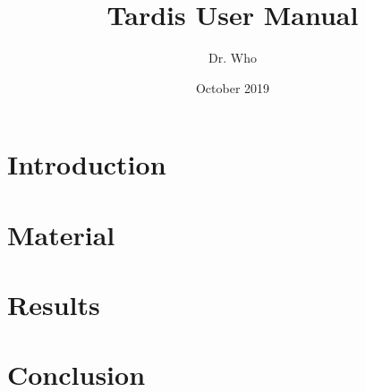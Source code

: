 \documentclass{article}
\title{Tardis User Manual}
\author{Dr. Who}
\date{October 2019} %
\begin{document}
\maketitle

\begin{abstract}
    \blindtext
\end{abstract}

\section*{Introduction}
\lipsum[1-3]

\section*{Material}

\lipsum[4-7]

\section*{Results}
\lipsum[8-9]

\section*{Conclusion}
\lipsum[10-11]
\end{document}
